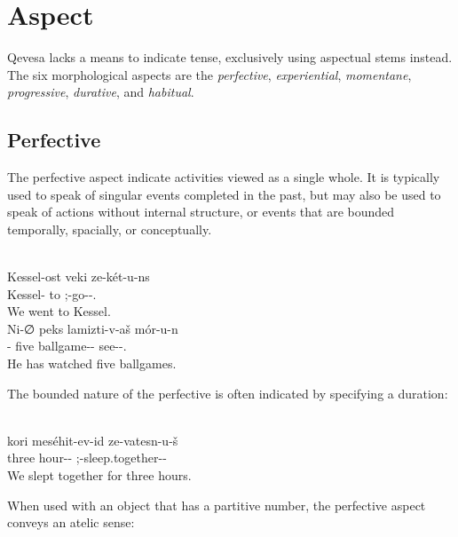 \documentclass[grammar]{subfiles}
\begin{document}
\section{Aspect}
\label{sec:vm:aspect}

Qevesa lacks a means to indicate tense, exclusively using aspectual stems
instead.  The six morphological aspects are the \emph{perfective},
\emph{experiential}, \emph{momentane}, \emph{progressive}, \emph{durative}, and
\emph{habitual}.


\subsection{Perfective}
\label{vp:ssec_perfective}

The perfective aspect indicate activities viewed as a single whole.  It is
typically used to speak of singular events completed in the past, but may also
be used to speak of actions without internal structure, or events that are
bounded temporally, spacially, or conceptually. 

\begin{exe}
  \ex {}\\ %
  \gll Kessel-ost veki ze-két-u-ns\\
  Kessel-{\Loc} to {\Fpl};{\Excl}-go-{\Perf}-{\AgtT}.{\Pl}\\
  \glt We went to Kessel.
  \ex {}\\
  \gll Ni-∅ peks lamizti-v-aš mór-u-n\\ 
  {\Tsg}-{\Dir} five ballgame-{\Du}-{\Acc} see-{\Perf}-{\Tsg}.{\AgtT}\\
  \glt He has watched five ballgames.
\end{exe}

The bounded nature of the perfective is often indicated by specifying a duration:

\begin{exe}
  \ex {}\\
  \gll kori meséhit-ev-id ze-vatesn-u-š\\
  three hour-{\Du}-{\Ess} {\Fdu};{\Excl}-sleep.together-{\Perf}-{\PatT}\\
  \glt We slept together for three hours.
\end{exe}


When used with an object that has a partitive number, the perfective aspect
conveys an atelic sense:
\end{document}
